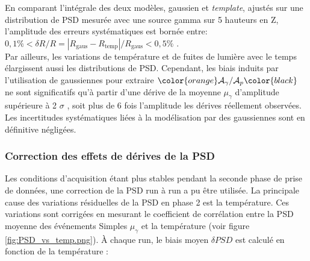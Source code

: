 \bigbreak

En comparant l'intégrale des deux modèles, gaussien et \textit{template}, ajustés sur une distribution de PSD mesurée avec une source gamma sur 5 hauteurs en Z, l'amplitude des erreurs systématiques est bornée entre: $0,1\% < \delta R/R = |R_\textrm{gaus} - R_\textrm{temp}|/R_\textrm{gaus} < 0,5\%$ \cite{docdb642}.\\

Par ailleurs, les variations de température et de fuites de lumière avec le temps élargissent aussi les distributions de PSD. Cependant, les biais induits par l'utilisation de gaussiennes pour extraire $\color{orange}\mathcal{A}_\gamma/\mathcal{A}_p\color{black}$ ne sont significatifs qu'à partir d'une dérive de la moyenne $\mu_\gamma$ d'amplitude supérieure à 2 $\sigma$ \cite{docdb717}, soit plus de 6 fois l'amplitude les dérives réellement observées. Les incertitudes systématiques liées à la modélisation par des gaussiennes sont en définitive négligées.\\

\subsubsection*{Correction des effets de dérives de la PSD}


Les conditions d'acquisition étant plus stables pendant la seconde phase de prise de données, une correction de la PSD run à run a pu être utilisée. La principale cause des variations résiduelles de la PSD en phase 2 est la température. Ces variations sont corrigées en mesurant le coefficient de corrélation entre la PSD moyenne des événements Simples $\mu_\gamma$ et la température (voir figure \ref{fig:PSD_vs_temp.png}). À chaque run, le biais moyen $\delta PSD$ est calculé en fonction de la température :

